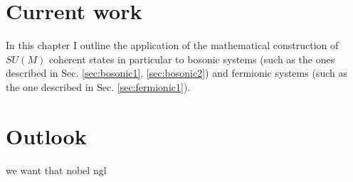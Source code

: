 \documentclass[12pt]{report}
\begin{document}
	
	
	
	
	
	
	
	
	
	
	
	
	
	
	\chapter{Current work}
	In this chapter I outline the application of the mathematical construction of $SU(M)$ coherent states in particular to bosonic systems (such as the ones described in Sec. \ref{sec:bosonic1}, \ref{sec:bosonic2}) and fermionic systems (such as the one described in Sec. \ref{sec:fermionic1}).
	
	
	
	
	
	
	
	
	
	\chapter{Outlook}
	
	we want that nobel ngl
	
	
	
\end{document}
